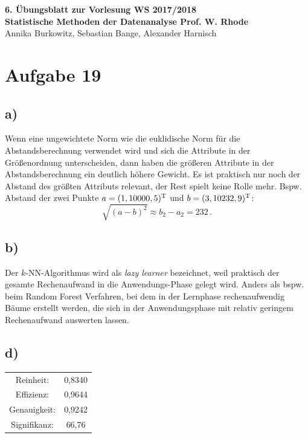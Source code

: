 \documentclass[a4paper, 11pt]{article}
\begin{document}
\noindent
\large{\textbf{6. Übungsblatt zur Vorlesung \hfill WS 2017/2018 \\
Statistische Methoden der Datenanalyse \hfill Prof. W. Rhode}} \\
Annika Burkowitz, Sebastian Bange, Alexander Harnisch \\
\noindent\makebox[\linewidth]{\rule{\textwidth}{0.4pt}}

\section*{Aufgabe 19}
\subsection*{a)}
Wenn eine ungewichtete Norm wie die euklidische Norm für die Abstandsberechnung
verwendet wird und sich die Attribute in der Größenordnung unterscheiden, dann
haben die größeren Attribute in der Abstandsberechnung ein deutlich höhere
Gewicht. Es ist praktisch nur noch der Abstand des größten Attributs relevant,
der Rest spielt keine Rolle mehr. Bspw. Abstand der zwei Punkte $a = (1, 10000,
5)^{\textup{T}}$ und $b = (3, 10232, 9)^{\textup{T}}$:
\begin{equation}
    \sqrt{(a - b)^2} \approx b_2 - a_2 = 232\,.
\end{equation}

\subsection*{b)}
Der $k$-NN-Algorithmus wird als \textit{lazy learner} bezeichnet, weil
praktisch der gesamte Rechenaufwand in die Anwendungs-Phase gelegt wird. Anders
als bspw. beim Random Forest Verfahren, bei dem in der Lernphase
rechenaufwendig Bäume erstellt werden, die sich in der Anwendungsphase mit
relativ geringem Rechenaufwand auswerten lassen.

\subsection*{d)}
\begin{center}
    \begin{tabular}{cc}
        Reinheit: & 0,8340\\
        Effizienz: & 0,9644\\
        Genauigkeit: & 0,9242\\
        Signifikanz: & 66,76\\
    \end{tabular}
\end{center}
\end{document}
